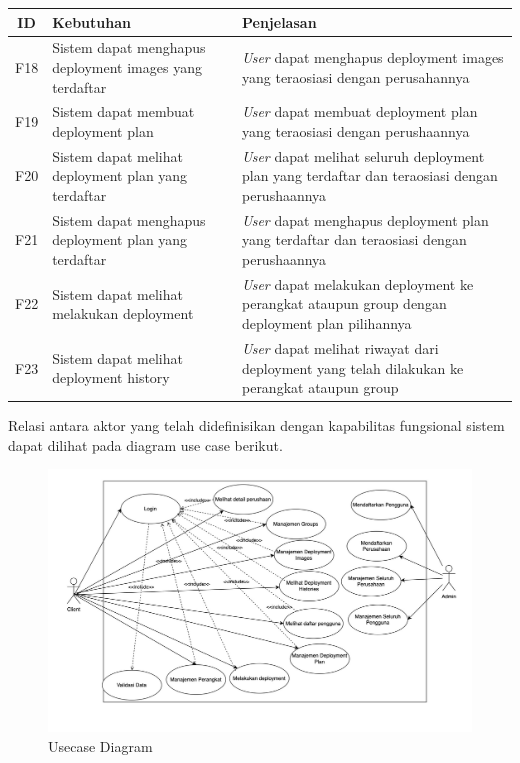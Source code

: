 \begin{table}[h]
  \centering
  \begin{tabular}{|c|p{4.5cm}|p{8cm}|}
    \hline
    ID  & Kebutuhan                                                                      & Penjelasan                                                                                                      \\

    \hline
    F18 & Sistem dapat menghapus deployment images yang terdaftar                        & \textit{User} dapat menghapus deployment images yang teraosiasi dengan perusahannya                             \\
    \hline
    F19 & Sistem dapat membuat deployment plan                                           & \textit{User} dapat membuat deployment plan yang teraosiasi dengan perushaannya                                 \\
    \hline
    F20 & Sistem dapat melihat deployment plan yang terdaftar                            & \textit{User} dapat melihat seluruh deployment plan yang terdaftar dan teraosiasi dengan perushaannya           \\
    \hline
    F21 & Sistem dapat menghapus deployment plan yang terdaftar                          & \textit{User} dapat menghapus deployment plan yang terdaftar dan teraosiasi dengan perushaannya                 \\
    \hline
    F22 & Sistem dapat melihat melakukan deployment                                      & \textit{User} dapat melakukan deployment ke perangkat ataupun group dengan deployment plan pilihannya           \\
    \hline
    F23 & Sistem dapat melihat  deployment history                                       & \textit{User} dapat melihat riwayat dari deployment yang telah dilakukan ke perangkat ataupun group             \\
    \hline
  \end{tabular}
\end{table}

\pagebreak

Relasi antara aktor yang telah didefinisikan dengan kapabilitas fungsional sistem dapat dilihat pada diagram use case berikut.

\begin{figure}[h]
  \centering
  \includegraphics[width=1\textwidth]{resources/chapter-3/usecase-diagram.jpg}
  \caption{Usecase Diagram}
  \label{fig:usecase-diagram}
\end{figure}